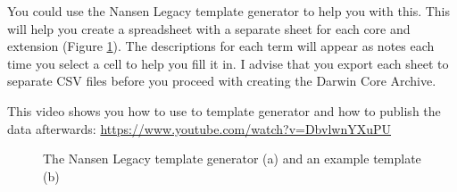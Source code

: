 \documentclass[a4paper,english, 11pt]{article}
\begin{document}
You could use the Nansen Legacy template generator to help you with this. This will help you create a spreadsheet with a separate sheet for each core and extension (Figure \ref{fig:tg}). The descriptions for each term will appear as notes each time you select a cell to help you fill it in. I advise that you export each sheet to separate CSV files before you proceed with creating the Darwin Core Archive.

This video shows you how to use to template generator and how to publish the data afterwards: \url{https://www.youtube.com/watch?v=DbvlwnYXuPU}

\begin{figure}[htb]
    \caption{\label{fig:tg}
        The Nansen Legacy template generator (a) and an example template (b)
    }
\end{figure}
\end{document}
